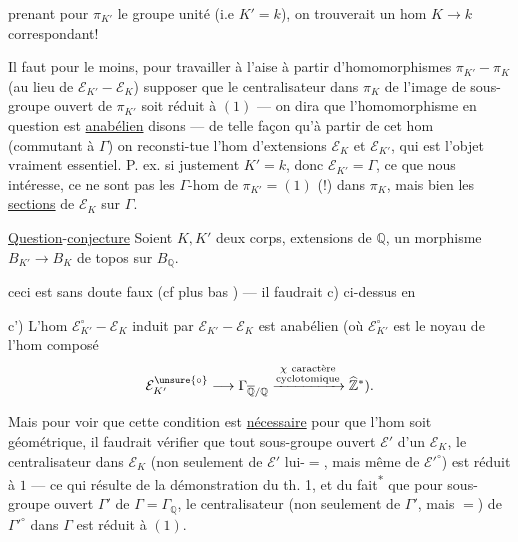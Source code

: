 prenant pour $\pi_{K'}$ le groupe unité (i.e $K'=k$), on trouverait un hom $K\longrightarrow k$ correspondant!

Il faut pour le moins, pour travailler à l'aise à partir d'homomorphismes $\pi_{K'}-\pi_K$ (au lieu de $\mathcal E_{K'}-\mathcal E_K$) supposer que le centralisateur dans $\pi_K$ de l'image de  sous-groupe ouvert de $\pi_{K'}$ soit réduit à $(1)$ --- on dira que l'homomorphisme en question est \uline{anabélien} disons --- de telle façon qu'à partir de cet hom (commutant à $\Gamma$) on reconsti-tue l'hom d'extensions $\mathcal E_K$ et $\mathcal E_{K'}$, qui est l'objet vraiment essentiel. P. ex. si justement $K'=k$, donc $\mathcal E_{K'}=\Gamma$, ce que nous intéresse, ce ne sont pas les $\Gamma$-hom de $\pi_{K'}=(1)$ (!) dans $\pi_K$, mais bien les \uline{sections} de $\mathcal E_K$ sur $\Gamma$.

\uline{Question}-\uline{conjecture} Soient $K,K'$ deux corps, extensions   de $\mathbb Q$,   un morphisme $B_{K'}\longrightarrow B_K$ de topos sur $B_{\mathbb Q}$.

ceci est sans doute faux (cf plus bas ) --- il faudrait    c) ci-dessus en

c') L'hom $\mathcal E_{K'}^\circ-\mathcal E_K$ induit par $\mathcal E_{K'}-\mathcal E_K$ est anabélien (où $\mathcal E_{K'}^\circ$ est le noyau de l'hom composé
\[
\mathcal E_{K'}^{\unsure{\circ}}\longrightarrow\Gamma_{\overline{\mathbb Q}/\mathbb Q}\xrightarrow{\substack{\chi\ \text{caractère}\\\text{cyclotomique}}}\widehat{\mathbb Z}^{*}).
\]

Mais pour voir que cette condition est \uline{nécessaire} pour que l'hom soit géométrique, il faudrait  vérifier que  tout sous-groupe ouvert $\mathcal E'$ d'un $\mathcal E_K$, le centralisateur dans $\mathcal E_K$ (non seulement de $\mathcal E'$ lui-$=$, mais même de $\mathcal E'^\circ$) est réduit à $1$ --- ce qui résulte de la démonstration du th. 1, et du fait\textsuperscript{*} que pour  sous-groupe ouvert $\Gamma'$ de $\Gamma=\Gamma_{\mathbb Q}$, le centralisateur (non seulement de $\Gamma'$, mais $=$) de $\Gamma'^\circ$ dans $\Gamma$ est réduit à $(1)$.

